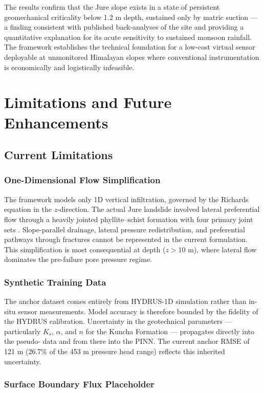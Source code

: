 \documentclass[12pt]{report}
\begin{document}
The results confirm that the Jure slope exists in a state of
persistent geomechanical criticality below 1.2 m depth, sustained
only by matric suction — a finding consistent with published
back-analyses of the site and providing a quantitative explanation
for its acute sensitivity to sustained monsoon rainfall. The
framework establishes the technical foundation for a low-cost
virtual sensor deployable at unmonitored Himalayan slopes where
conventional instrumentation is economically and logistically
infeasible.
\chapter{Limitations and Future Enhancements}

\section{Current Limitations}

\subsection{One-Dimensional Flow Simplification}

The framework models only 1D vertical infiltration, governed by the
Richards equation in the $z$-direction. The actual Jure landslide
involved lateral preferential flow through a heavily jointed
phyllite--schist formation with four primary joint sets
\cite{bray2023jure}. Slope-parallel drainage, lateral pressure
redistribution, and preferential pathways through fractures cannot
be represented in the current formulation. This simplification is
most consequential at depth ($z > 10$ m), where lateral flow
dominates the pre-failure pore pressure regime.

\subsection{Synthetic Training Data}

The anchor dataset comes entirely from HYDRUS-1D simulation rather
than in-situ sensor measurements. Model accuracy is therefore
bounded by the fidelity of the HYDRUS calibration. Uncertainty in
the geotechnical parameters — particularly $K_s$, $\alpha$, and
$n$ for the Kuncha Formation — propagates directly into the pseudo-
data and from there into the PINN. The current anchor RMSE of
121 m (26.7\% of the 453 m pressure head range) reflects this
inherited uncertainty.

\subsection{Surface Boundary Flux Placeholder}
\end{document}
